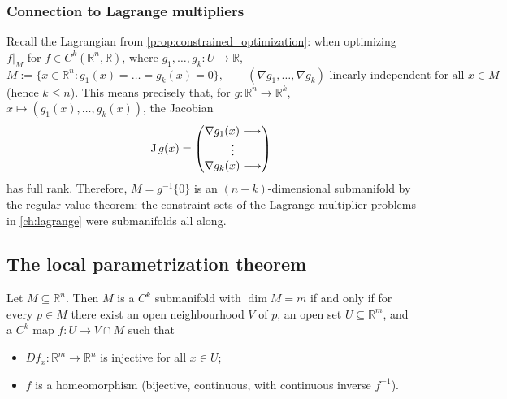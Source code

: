 \subsubsection{Connection to Lagrange multipliers}

\begin{remark}
Recall the Lagrangian from \cref{prop:constrained_optimization}: when optimizing $f|_M$ for
$f \in C^k(\mathbb{R}^n,\mathbb{R})$, where $g_1,\dots,g_k : U \to \mathbb{R}$,
\[M := \{x \in \mathbb{R}^n : g_1(x)=\dots=g_k(x)=0\}, \qquad (\nabla g_1,\dots,\nabla g_k) \text{ linearly independent for all } x \in M\]
(hence $k \leq n$). This means precisely that, for $g : \mathbb{R}^n \to \mathbb{R}^k$,
$x \mapsto (g_1(x),\dots,g_k(x))$, the Jacobian
\[\operatorname{J} g(x) = \begin{pmatrix} \nabla g_1(x) \longrightarrow \\ \vdots \\ \nabla g_k(x) \longrightarrow \end{pmatrix}\]
has full rank. Therefore, $M = g^{-1}\{0\}$ is an $(n-k)$-dimensional submanifold by the regular
value theorem: the constraint sets of the Lagrange-multiplier problems in \cref{ch:lagrange}
were submanifolds all
along.
\end{remark}

\subsection{The local parametrization theorem}

\begin{theorem}
\label{thm:local_parametrization}
Let $M \subseteq \mathbb{R}^n$. Then $M$ is a $C^k$ submanifold with $\dim M = m$ if and only if
for every $p \in M$ there exist an open neighbourhood $V$ of $p$, an open set $U \subseteq
\mathbb{R}^m$, and a $C^k$ map $f : U \to V \cap M$ such that
\begin{itemize}
  \item $Df_x : \mathbb{R}^m \to \mathbb{R}^n$ is injective for all $x \in U$;
  \item $f$ is a homeomorphism (bijective, continuous, with continuous inverse $f^{-1}$).
\end{itemize}
\end{theorem}

